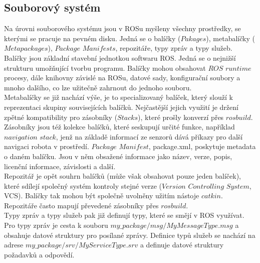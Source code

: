 \documentclass[12pt]{report}
\begin{document}
\subsection{Souborový systém}
Na úrovni souborového systému jsou v ROSu myšleny všechny prostředky, se kterými se pracuje na pevném disku. Jedná se o balíčky ($Pakages$), metabalíčky ($Metapackages$), $Package$ $Manifests$, repozitáře, typy zpráv a typy služeb.\\
\indent Balíčky jsou základní stavební jednotkou softwaru ROS. Jedná se o nejnižší strukturu umožňující tvorbu programu. Balíčky mohou obsahovat $ROS$ $runtime$ procesy, dále knihovny závislé na ROSu, datové sady, konfigurační soubory a mnoho dalšího, co lze užitečně zahrnout do jednoho souboru.\\
\indent Metabalíčky se již nachází výše, je to specializovaný balíček, který slouží k reprezentaci skupiny souvisejících balíčků. Nejčastější jejich využití je držení zpětné kompatibility pro zásobníky ($Stacks$), které prošly konverzí přes $rosbuild$. Zásobníky jsou též kolekce balíčků, které seskupují určité funkce, například $navigation$ $stack$, jenž na základě informací ze senzorů dává příkazy pro další navigaci robota v prostředí. $Package$ $Manifest$, package.xml, poskytuje metadata o daném balíčku. Jsou v něm obsažené informace jako název, verze, popis, licenční informace, závislosti a další.\\
\indent Repozitář je opět souhrn balíčků (může však obsahovat pouze jeden balíček), které sdílejí společný systém kontroly stejné verze ($Version$ $Controlling$ $System$, VCS). Balíčky tak mohou být společně uvolněny užitím nástoje $catkin$. Repozitáře často mapují převedené zásobníky přes $rosbuild$.\\
\indent Typy zpráv a typy služeb pak již definují typy, které se smějí v ROS využívat. Pro typy zpráv je cesta k souboru $my\_package/msg/MyMessageType.msg$ a obsahuje datové struktury pro posílané zprávy. Definice typů služeb se nachází na adrese $my\_package/srv/MyServiceType.srv$ a definuje datové struktury požadavků a odpovědí.\\
\end{document}

